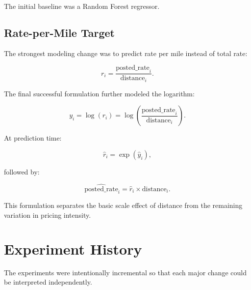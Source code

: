 \documentclass[11pt,a4paper]{article}
\begin{document}
The initial baseline was a Random Forest regressor.

\subsection{Rate-per-Mile Target}

The strongest modeling change was to predict rate per mile instead of total rate:

\[
r_i = \frac{\text{posted\_rate}_i}{\text{distance}_i}.
\]

The final successful formulation further modeled the logarithm:

\[
y_i = \log(r_i)
= \log\left(
\frac{\text{posted\_rate}_i}{\text{distance}_i}
\right).
\]

At prediction time:

\[
\widehat{r}_i = \exp(\widehat{y}_i),
\]

followed by:

\[
\widehat{\text{posted\_rate}}_i
=
\widehat{r}_i \times \text{distance}_i.
\]

This formulation separates the basic scale effect of distance from the remaining variation in pricing intensity.

\section{Experiment History}

The experiments were intentionally incremental so that each major change could be interpreted independently.
\end{document}

